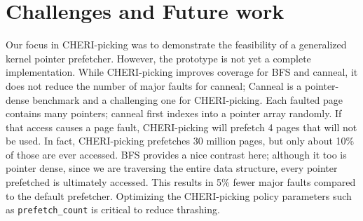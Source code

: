 \vspace{-0.2cm}
\section{Challenges and Future work} 
\label{sec:6}

Our focus in CHERI-picking was to demonstrate the feasibility of a generalized kernel pointer prefetcher. However, the prototype is not yet a complete implementation. While CHERI-picking improves coverage for BFS and canneal, it does not reduce the number of major faults for canneal; Canneal is a pointer-dense benchmark and a challenging one for CHERI-picking.
Each faulted page contains many pointers; canneal first indexes into a pointer array randomly. 
If that access causes a page fault, CHERI-picking will prefetch 4 pages that will not be used.
In fact, CHERI-picking prefetches 30 million pages, but only about 10\% of those are ever accessed.
BFS provides a nice contrast here; although it too is pointer dense, since we are traversing the entire data structure, every pointer prefetched is ultimately accessed. This results in 5\% fewer major faults compared to the default prefetcher. Optimizing the CHERI-picking policy parameters such as \texttt{prefetch\_count} is critical to reduce thrashing. 


